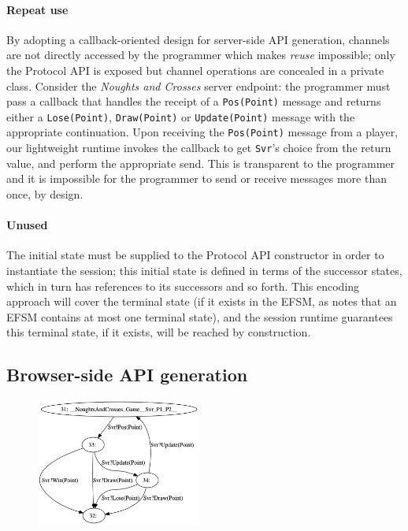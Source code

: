 \documentclass[submission,copyright,creativecommons]{eptcs}
\begin{document}
\paragraph{Repeat use} By adopting a callback-oriented design for server-side API generation, channels are not directly accessed by the programmer which makes \textit{reuse} impossible; only the Protocol API is exposed but channel operations are concealed in a private class. Consider the \textit{Noughts and Crosses} server endpoint: the programmer must pass a callback that handles the receipt of a \texttt{Pos(Point)} message and returns either a \texttt{Lose(Point)}, \texttt{Draw(Point)} or \texttt{Update(Point)} message with the appropriate continuation. Upon receiving the \texttt{Pos(Point)} message from a player, our lightweight runtime invokes the callback to get \texttt{Svr}'s choice from the return value, and perform the appropriate send. This is transparent to the programmer and it is impossible for the programmer to send or receive messages more than once, by design.

\paragraph{Unused} The initial state must be supplied to the Protocol API constructor in order to instantiate the session; this initial state is defined in terms of the successor states, which in turn has references to its successors and so forth. This encoding approach will cover the terminal state (if it exists in the EFSM, as \cite{Hybrid2016} notes that an EFSM contains at most one terminal state), and the session runtime guarantees this terminal state, if it exists, will be reached by construction. 

\subsection{Browser-side API generation}
\label{section:browser}

\begin{figure}
  \begin{center}
    \includegraphics[width=0.48\textwidth]{figures/efsm_p1.png}
  \end{center}

  \label{fig:efsmp1}
\end{figure}
\end{document}

